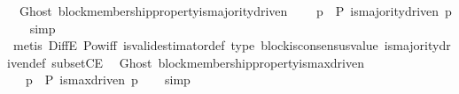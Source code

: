 \begin{isabellebody}
%
\isadelimproof
\isanewline
%
\endisadelimproof
\isanewline
{}\isamarkupfalse%
\ {\isacharparenleft}\ Ghost{\isacharparenright}\ block{\isacharunderscore}membership{\isacharunderscore}property{\isacharunderscore}is{\isacharunderscore}majority{\isacharunderscore}driven\ {\isacharcolon}\isanewline
\ \ {\isachardoublequoteopen}{\isasymforall}\ p\ {\isasymin}\ P{\isachardot}\ is{\isacharunderscore}majority{\isacharunderscore}driven\ p{\isachardoublequoteclose}\isanewline
%
\isadelimproof
\ \ %
\endisadelimproof
%
\isatagproof
{}\isamarkupfalse%
\ simp\isanewline
\ \ \isamarkupfalse%
\ {\isacharparenleft}metis\ DiffE\ Pow{\isacharunderscore}iff\ is{\isacharunderscore}valid{\isacharunderscore}estimator{\isacharunderscore}def\ {\isasymepsilon}{\isacharunderscore}type\ block{\isacharunderscore}is{\isacharunderscore}consensus{\isacharunderscore}value\ is{\isacharunderscore}majority{\isacharunderscore}driven{\isacharunderscore}def\ subsetCE{\isacharparenright}%
\endisatagproof
{\isafoldproof}%
%
\isadelimproof
\isanewline
%
\endisadelimproof
\isanewline
{}\isamarkupfalse%
\ {\isacharparenleft}\ Ghost{\isacharparenright}\ block{\isacharunderscore}membership{\isacharunderscore}property{\isacharunderscore}is{\isacharunderscore}max{\isacharunderscore}driven\ {\isacharcolon}\isanewline
\ \ {\isachardoublequoteopen}{\isasymforall}\ p\ {\isasymin}\ P{\isachardot}\ is{\isacharunderscore}max{\isacharunderscore}driven\ p{\isachardoublequoteclose}\isanewline
%
\isadelimproof
\ \ %
\endisadelimproof
%
\isatagproof
{}\isamarkupfalse%
\ simp\isanewline
\ \ \isanewline
\ \ \isanewline
\ \ \isamarkupfalse%
%
\endisatagproof
{\isafoldproof}%
%
\isadelimproof
\isanewline
%
\endisadelimproof
%
\isadelimtheory
\isanewline
%
\endisadelimtheory
%
\isatagtheory
{}\isamarkupfalse%
%
\endisatagtheory
{\isafoldtheory}%
%
\isadelimtheory
%
\endisadelimtheory
%
\end{isabellebody}%
\endinput
